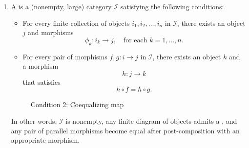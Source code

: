 \begin{definition} \label{definition:filtered_cofiltered_category}
    \begin{enumerate}
        \item 
        A  is a (nonempty, large) category $\mathcal{I}$ satisfying the following conditions:

        \begin{itemize}
            \item For every finite collection of objects $i_1, i_2, \ldots, i_n$ in $\mathcal{I}$, there exists an object $j$ and morphisms
            \[
            \phi_k: i_k \to j, \quad \text{for each } k=1, \ldots, n.
            \]

            \item For every pair of morphisms $f,g: i \to j$ in $\mathcal{I}$, there exists an object $k$ and a morphism 
            \[
            h: j \to k
            \] 
            that satisfies 
            \[
            h \circ f = h \circ g.
            \]
        \end{itemize}

        \begin{figure}[h]
            \centering
            \begin{minipage}{0.45\textwidth}
                \centering
                \caption*{Condition 1: Upper Bound}
            \end{minipage}
            \hfill
            \begin{minipage}{0.45\textwidth}
                \centering
                \caption*{Condition 2: Coequalizing map}
            \end{minipage}
        \end{figure}
        In other words, $\mathcal{I}$ is nonempty, any finite diagram of objects admits a , and any pair of parallel morphisms become equal after post-composition with an appropriate morphism.


\end{enumerate}
\end{definition}
